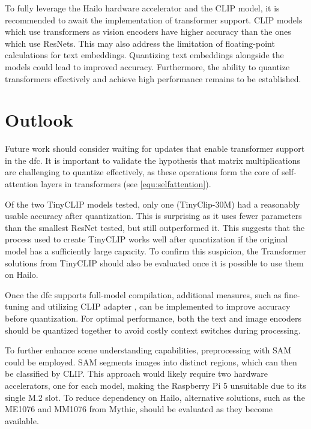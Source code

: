 To fully leverage the Hailo hardware accelerator and the CLIP model, it is recommended to await the implementation of transformer support.
CLIP models which use transformers as vision encoders have higher accuracy than the ones which use ResNets. 
This may also address the limitation of floating-point calculations for text embeddings.  
Quantizing text embeddings alongside the models could lead to improved accuracy.  
Furthermore, the ability to quantize transformers effectively and achieve high performance remains to be established.   

\section{Outlook}
Future work should consider waiting for updates that enable transformer support in the \acrshort{dfc}.  
It is important to validate the hypothesis that matrix multiplications are challenging to quantize effectively, as these operations form the core of self-attention layers in transformers (see \cref{equ:selfattention}).  

Of the two TinyCLIP models tested, only one (TinyClip-30M) had a reasonably usable accuracy after quantization.
This is surprising as it uses fewer parameters than the smallest ResNet tested, but still outperformed it.
This suggests that the process used to create TinyCLIP works well after quantization if the original model has a sufficiently large capacity.
To confirm this suspicion, the Transformer solutions from TinyCLIP should also be evaluated once it is possible to use them on Hailo.

Once the \acrshort{dfc} supports full-model compilation, additional measures, such as fine-tuning and utilizing CLIP adapter \cite{clipadapter}, can be implemented to improve accuracy before quantization.  
For optimal performance, both the text and image encoders should be quantized together to avoid costly context switches during processing.  

To further enhance scene understanding capabilities, preprocessing with SAM \cite{sam} could be employed.  
SAM segments images into distinct regions, which can then be classified by CLIP.  
This approach would likely require two hardware accelerators, one for each model, making the Raspberry Pi 5 unsuitable due to its single M.2 slot.  
To reduce dependency on Hailo, alternative solutions, such as the ME1076 and MM1076 from Mythic, should be evaluated as they become available.

